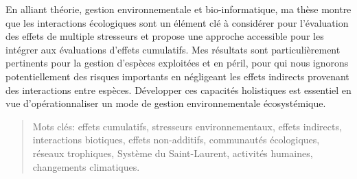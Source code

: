 En alliant théorie, gestion environnementale et bio-informatique, ma
thèse montre que les interactions écologiques sont un élément clé à
considérer pour l'évaluation des effets de multiple stresseurs et
propose une approche accessible pour les intégrer aux évaluations
d'effets cumulatifs. Mes résultats sont particulièrement pertinents pour
la gestion d'espèces exploitées et en péril, pour qui nous ignorons
potentiellement des risques importants en négligeant les effets
indirects provenant des interactions entre espèces. Développer ces
capacités holistiques est essentiel en vue d'opérationnaliser un mode de
gestion environnementale écosystémique.

\begin{quote}
Mots clés: effets cumulatifs, stresseurs environnementaux, effets
indirects, interactions biotiques, effets non-additifs, communautés
écologiques, réseaux trophiques, Système du Saint-Laurent, activités
humaines, changements climatiques.
\end{quote}
